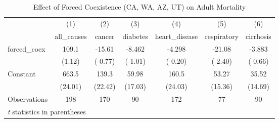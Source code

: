 \documentclass[12pt]{article}
\begin{document}
\begin{table}[htbp]\centering \caption{Effect of Forced Coexistence (CA, WA, AZ, UT) on Adult Mortality\label{adult3}} \begin{tabular}{l*{6}{c}} \toprule
                    &\multicolumn{1}{c}{(1)}&\multicolumn{1}{c}{(2)}&\multicolumn{1}{c}{(3)}&\multicolumn{1}{c}{(4)}&\multicolumn{1}{c}{(5)}&\multicolumn{1}{c}{(6)}\\
                    &\multicolumn{1}{c}{all\_causes}&\multicolumn{1}{c}{cancer}&\multicolumn{1}{c}{diabetes}&\multicolumn{1}{c}{heart\_disease}&\multicolumn{1}{c}{respiratory}&\multicolumn{1}{c}{cirrhosis}\\
\midrule
forced\_coex         &       109.1&      -15.61&      -8.462&      -4.298&      -21.08&      -3.883\\
                    &      (1.12)&     (-0.77)&     (-1.01)&     (-0.20)&     (-2.40)&     (-0.66)\\
\addlinespace
Constant            &       663.5&       139.3&       59.98&       160.5&       53.27&       35.52\\
                    &     (24.01)&     (22.42)&     (17.03)&     (24.03)&     (15.36)&     (14.69)\\
\midrule
Observations        &         198&         170&          90&         172&          77&          90\\
\bottomrule
\multicolumn{7}{l}{\footnotesize \textit{t} statistics in parentheses}\\
\end{tabular}
\end{table}
\end{document}
